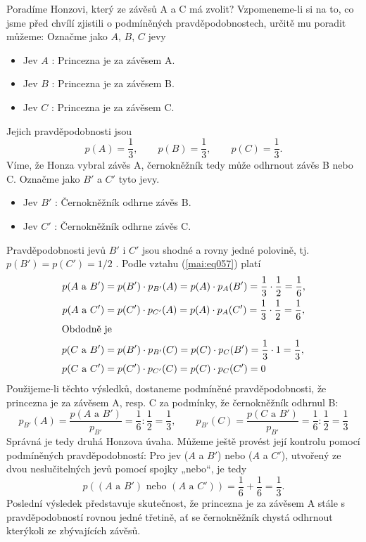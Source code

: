 \begin{example}
  Poradíme Honzovi, který ze závěsů A a C má zvolit? Vzpomeneme-li si na to, co jsme před chvílí 
  zjistili o podmíněných pravděpodobnostech, určitě mu poradit můžeme: Označme jako \(A\), \(B\), 
  \(C\) jevy
  \begin{itemize}
    \item Jev \(A\) : Princezna je za závěsem A.
    \item Jev \(B\) : Princezna je za závěsem B.
    \item Jev \(C\) : Princezna je za závěsem C.
  \end{itemize}
  Jejich pravděpodobnosti jsou
  \begin{equation*}
    p(A) = \dfrac{1}{3}, \qquad p(B) = \dfrac{1}{3}, \qquad p(C) = \dfrac{1}{3}.
  \end{equation*}
  Víme, že Honza vybral závěs A, černokněžník tedy může odhrnout závěs B nebo C. Označme jako 
  \(B'\) a \(C'\) tyto jevy.
  \begin{itemize}
    \item Jev \(B'\) : Černokněžník odhrne závěs B.
    \item Jev \(C'\) : Černokněžník odhrne závěs C.
  \end{itemize}
  Pravděpodobnosti jevů \(B'\) i \(C'\) jsou shodné a rovny jedné polovině, tj. \(p(B') = p(C') = 
  1/2\) . Podle vztahu (\ref{mai:eq057}) platí
  \begin{align*}
    p(A\text{ a }B') &= p(B')\cdot p_{B'}(A) = p(A)\cdot p_{A}(B') 
                      = \dfrac{1}{3}\cdot\dfrac{1}{2} = \dfrac{1}{6},  \\
    p(A\text{ a }C') &= p(C')\cdot p_{C'}(A) = p(A)\cdot p_{A}(C')
                      = \dfrac{1}{3}\cdot\dfrac{1}{2} = \dfrac{1}{6},  \\
    \shortintertext{Obdodně je}
    p(C\text{ a }B') &= p(B')\cdot p_{B'}(C) = p(C)\cdot p_{C}(B')
                      = \dfrac{1}{3}\cdot1 = \dfrac{1}{3},              \\
    p(C\text{ a }C') &= p(C')\cdot p_{C'}(C) = p(C)\cdot p_{C}(C') = 0  \\
  \end{align*}
  Použijeme-li těchto výsledků, dostaneme podmíněné pravděpodobnosti, že princezna je za závěsem A, 
  resp. C za podmínky, že černokněžník odhrnul B:
  \begin{equation*}
    p_{B'}(A) = \dfrac{p(A\text{ a }B')}{p_{B'}} = \dfrac{1}{6}:\dfrac{1}{2} = \dfrac{1}{3},  \qquad
    p_{B'}(C) = \dfrac{p(C\text{ a }B')}{p_{B'}} = \dfrac{1}{6}:\dfrac{1}{2} = \dfrac{1}{3}    
  \end{equation*}
  Správná je tedy druhá Honzova úvaha. Můžeme ještě provést její kontrolu pomocí podmíněných 
  pravděpodobností: Pro jev (\(A\) a \(B'\)) nebo (\(A\) a \(C'\)), utvořený ze dvou neslučitelných 
  jevů pomocí spojky „nebo“, je tedy
  \begin{equation*}
    p\left((A\text{ a }B')\text{ nebo }(A\text{ a }C')\right) = \dfrac{1}{6} + \dfrac{1}{6} 
      = \dfrac{1}{3}.
  \end{equation*}
  Poslední výsledek představuje skutečnost, že princezna je za závěsem A stále s pravděpodobností 
  rovnou jedné třetině, ať se černokněžník chystá odhrnout kterýkoli ze zbývajících závěsů.
\normalsize
\end{example}